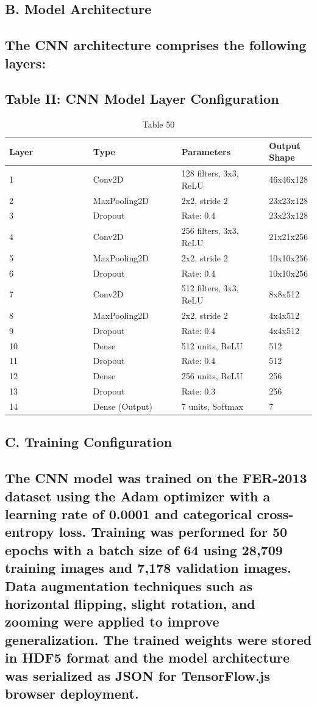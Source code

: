 \documentclass[conference]{IEEEtran}
\begin{document}
\subsection{B. Model Architecture}
\subsection{The CNN architecture comprises the following layers:}
\subsection{Table II: CNN Model Layer Configuration}
\begin{table}[t]
\centering
\caption{Table 50}
\begin{tabular}{|p{0.3\linewidth}|p{0.3\linewidth}|p{0.3\linewidth}|p{0.3\linewidth}|}
\hline
Layer & Type & Parameters & Output Shape \\
\hline
1 & Conv2D & 128 filters, 3x3, ReLU & 46x46x128 \\
\hline
2 & MaxPooling2D & 2x2, stride 2 & 23x23x128 \\
\hline
3 & Dropout & Rate: 0.4 & 23x23x128 \\
\hline
4 & Conv2D & 256 filters, 3x3, ReLU & 21x21x256 \\
\hline
5 & MaxPooling2D & 2x2, stride 2 & 10x10x256 \\
\hline
6 & Dropout & Rate: 0.4 & 10x10x256 \\
\hline
7 & Conv2D & 512 filters, 3x3, ReLU & 8x8x512 \\
\hline
8 & MaxPooling2D & 2x2, stride 2 & 4x4x512 \\
\hline
9 & Dropout & Rate: 0.4 & 4x4x512 \\
\hline
10 & Dense & 512 units, ReLU & 512 \\
\hline
11 & Dropout & Rate: 0.4 & 512 \\
\hline
12 & Dense & 256 units, ReLU & 256 \\
\hline
13 & Dropout & Rate: 0.3 & 256 \\
\hline
14 & Dense (Output) & 7 units, Softmax & 7 \\
\hline
\end{tabular}
\end{table}
\subsection{C. Training Configuration}
\subsection{The CNN model was trained on the FER-2013 dataset using the Adam optimizer with a learning rate of 0.0001 and categorical cross-entropy loss. Training was performed for 50 epochs with a batch size of 64 using 28,709 training images and 7,178 validation images. Data augmentation techniques such as horizontal flipping, slight rotation, and zooming were applied to improve generalization. The trained weights were stored in HDF5 format and the model architecture was serialized as JSON for TensorFlow.js browser deployment.}
\end{document}
